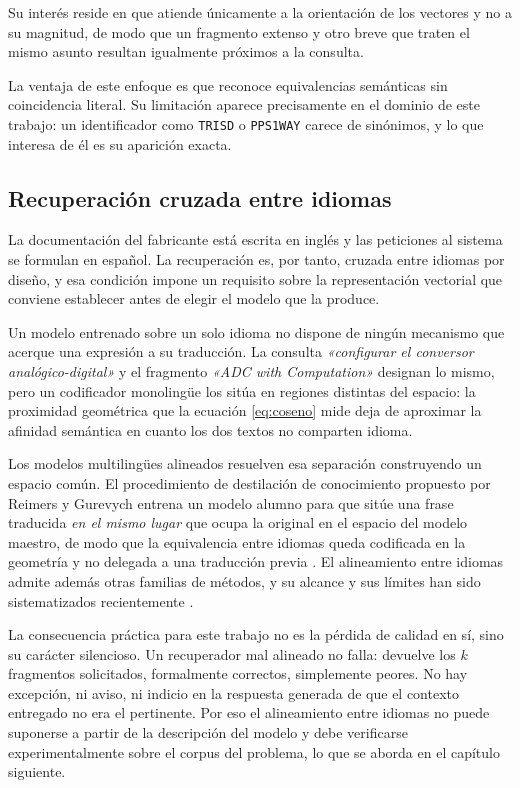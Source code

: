 Su interés reside en que atiende únicamente a la orientación de los vectores y
no a su magnitud, de modo que un fragmento extenso y otro breve que traten el
mismo asunto resultan igualmente próximos a la consulta.

La ventaja de este enfoque es que reconoce equivalencias semánticas sin
coincidencia literal. Su limitación aparece precisamente en el dominio de este
trabajo: un identificador como \texttt{TRISD} o \texttt{PPS1WAY} carece de
sinónimos, y lo que interesa de él es su aparición exacta.

\subsection{Recuperación cruzada entre idiomas}

La documentación del fabricante está escrita en inglés y las peticiones al
sistema se formulan en español. La recuperación es, por tanto, cruzada entre
idiomas por diseño, y esa condición impone un requisito sobre la
representación vectorial que conviene establecer antes de elegir el modelo que
la produce.

Un modelo entrenado sobre un solo idioma no dispone de ningún mecanismo que
acerque una expresión a su traducción. La consulta \emph{«configurar el
conversor analógico-digital»} y el fragmento \emph{«ADC with Computation»}
designan lo mismo, pero un codificador monolingüe los sitúa en regiones
distintas del espacio: la proximidad geométrica que la ecuación
\eqref{eq:coseno} mide deja de aproximar la afinidad semántica en cuanto los
dos textos no comparten idioma.

Los modelos multilingües alineados resuelven esa separación construyendo un
espacio común. El procedimiento de destilación de conocimiento propuesto por
Reimers y Gurevych entrena un modelo alumno para que sitúe una frase traducida
\emph{en el mismo lugar} que ocupa la original en el espacio del modelo
maestro, de modo que la equivalencia entre idiomas queda codificada en la
geometría y no delegada a una traducción previa
\cite{reimers2020multilingual}. El alineamiento entre idiomas admite además
otras familias de métodos, y su alcance y sus límites han sido sistematizados
recientemente \cite{hammerl2024alignment}.

La consecuencia práctica para este trabajo no es la pérdida de calidad en sí,
sino su carácter silencioso. Un recuperador mal alineado no falla: devuelve los
$k$ fragmentos solicitados, formalmente correctos, simplemente peores. No hay
excepción, ni aviso, ni indicio en la respuesta generada de que el contexto
entregado no era el pertinente. Por eso el alineamiento entre idiomas no puede
suponerse a partir de la descripción del modelo y debe verificarse
experimentalmente sobre el corpus del problema, lo que se aborda en el capítulo
siguiente.

